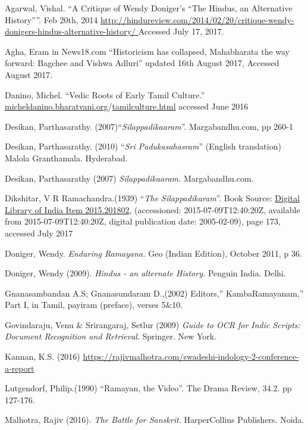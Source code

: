 \begin{thebibliography}{99}
 Agarwal, Vishal. “A Critique of Wendy Doniger’s “The Hindus, an Alternative History””. Feb 20th, 2014 \url{http://hindureview.com/2014/02/20/critique-wendy-donigers-hindus-alternative-history/ } Accessed July 17, 2017.

  Agha, Eram in News18.com “Historicism has collapsed, Mahabharata the way forward: Bagchee and Vishwa Adluri” updated 16th August 2017, Accessed August 2017.

  Danino, Michel. “Vedic Roots of Early Tamil Culture.” \url{micheldanino.bharatvani.org}/\url{tamilculture.html} accessed June 2016

  Desikan, Parthasarathy. (2007)“\textit{Silappadikaaram}”. Margabandhu.com, pp 260-1

  Desikan, Parthasarathy. (2010) “\textit{Sri Padukasahasram}” (English translation) Malola Granthamala. Hyderabad.

  Desikan, Parthasarathy (2007) \textit{Silappadikaaram.} Margabandhu.com.

  Dikshitar, V R Ramachandra.(1939) “\textit{The Silappadikaram}”. Book Source: \url{Digital Library of India Item 2015.201802}, (accessioned: 2015-07-09T12:40:20Z, available from 2015-07-09T12:40:20Z, digital publication date: 2005-02-09), page 173, accessed July 2017

  Doniger, Wendy. \textit{Enduring Ramayana.} Geo (Indian Edition), October 2011, p 36.

  Doniger, Wendy (2009). \textit{Hindus - an alternate History.} Penguin India. Delhi.

  Gnanasambandan A.S; Gnanasundaram D.,(2002) Editors,” KambaRamayanam,” Part I, in Tamil, payiram (preface), verses 5\&10.

  Govindaraju, Venu \& Srirangaraj, Setlur (2009) \textit{Guide to OCR for Indic Scripts:} \textit{Document Recognition and Retrieval}. Springer. New York.

  Kannan, K.S. (2016) \url{https://rajivmalhotra.com/swadeshi-indology-2-conference-a-report}

  Lutgendorf, Philip.(1990) “Ramayan, the Video”. The Drama Review, 34.2. pp 127-176.

  Malhotra, Rajiv (2016). \textit{The Battle for Sanskrit.} HarperCollins Publishers. Noida.


\end{thebibliography}
